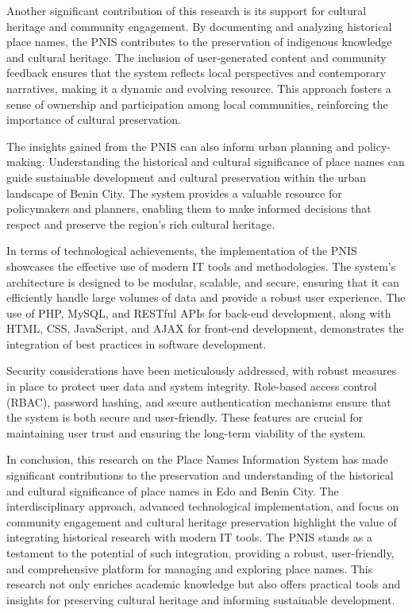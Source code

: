 Another significant contribution of this research is its support for cultural heritage and community engagement. By documenting and analyzing historical place names, the PNIS contributes to the preservation of indigenous knowledge and cultural heritage. The inclusion of user-generated content and community feedback ensures that the system reflects local perspectives and contemporary narratives, making it a dynamic and evolving resource. This approach fosters a sense of ownership and participation among local communities, reinforcing the importance of cultural preservation.

The insights gained from the PNIS can also inform urban planning and policy-making. Understanding the historical and cultural significance of place names can guide sustainable development and cultural preservation within the urban landscape of Benin City. The system provides a valuable resource for policymakers and planners, enabling them to make informed decisions that respect and preserve the region's rich cultural heritage.

In terms of technological achievements, the implementation of the PNIS showcases the effective use of modern IT tools and methodologies. The system's architecture is designed to be modular, scalable, and secure, ensuring that it can efficiently handle large volumes of data and provide a robust user experience. The use of PHP, MySQL, and RESTful APIs for back-end development, along with HTML, CSS, JavaScript, and AJAX for front-end development, demonstrates the integration of best practices in software development.

Security considerations have been meticulously addressed, with robust measures in place to protect user data and system integrity. Role-based access control (RBAC), password hashing, and secure authentication mechanisms ensure that the system is both secure and user-friendly. These features are crucial for maintaining user trust and ensuring the long-term viability of the system.

In conclusion, this research on the Place Names Information System has made significant contributions to the preservation and understanding of the historical and cultural significance of place names in Edo and Benin City. The interdisciplinary approach, advanced technological implementation, and focus on community engagement and cultural heritage preservation highlight the value of integrating historical research with modern IT tools. The PNIS stands as a testament to the potential of such integration, providing a robust, user-friendly, and comprehensive platform for managing and exploring place names. This research not only enriches academic knowledge but also offers practical tools and insights for preserving cultural heritage and informing sustainable development.